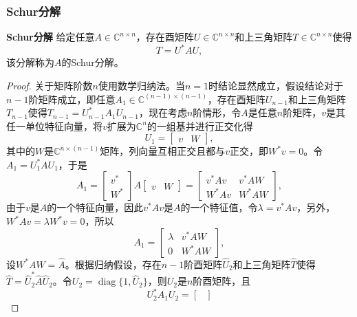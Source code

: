 \documentclass[a4paper,10pt]{ctexart}
\begin{document}
\subsubsection{Schur分解}
\begin{theorem}{\normalfont\bf{Schur分解}}
    给定任意$ A\in \mathbb{C}^{n\times n} $，存在酉矩阵$ U\in \mathbb{C}^{n\times n} $和上三角矩阵$ T\in \mathbb{C}^{n\times n} $使得
    \begin{equation}
        T = U^* A U,
    \end{equation}
    该分解称为$ A $的Schur分解。
\end{theorem}
\begin{proof}
    关于矩阵阶数$ n $使用数学归纳法。当$ n = 1 $时结论显然成立，假设结论对于$ n-1 $阶矩阵成立，即任意$ A_1\in \mathbb{C}^{(n-1)\times (n-1)} $，存在酉矩阵$ U_{n-1} $和上三角矩阵$ T_{n-1} $使得$ T_{n-1} = U_{n-1}^* A_1 U_{n-1} $，现在考虑$ n $阶情形，令$ A $是任意$ n $阶矩阵，$ v $是其任一单位特征向量，将$ v $扩展为$ \mathbb{C}^n $的一组基并进行正交化得
    \[
        U_1 = \begin{bmatrix} 
            v & W 
        \end{bmatrix},
    \]
    其中的$ W $是$ \mathbb{C}^{n\times (n-1)} $矩阵，列向量互相正交且都与$ v $正交，即$ W^*v = 0 $。令$ A_1 = U_1^* A U_1 $，于是
    \[
        A_1 = 
        \begin{bmatrix} 
            v^* \\ W^* 
        \end{bmatrix} A 
        \begin{bmatrix} 
            v & W
        \end{bmatrix} =
        \begin{bmatrix} 
            v^* A v & v^* A W \\
            W^* A v & W^* A W
        \end{bmatrix},
    \]
    由于$ v $是$ A $的一个特征向量，因此$ v^* A v $是$ A $的一个特征值，令$ \lambda = v^* A v $，另外，$ W^* A v = \lambda W^* v = 0 $，所以
    \[
        A_1 = 
        \begin{bmatrix} 
            \lambda & v^* A W \\
            0 & W^* A W
        \end{bmatrix},
    \]
    设$ W^*AW = \hat{A} $。根据归纳假设，存在$ n-1 $阶酉矩阵$ \hat{U}_2 $和上三角矩阵$ \hat{T} $使得$ \hat{T} = \hat{U}_2^* \hat{A} \hat{U}_2 $。令$ U_2 = \operatorname{diag}\{1, \hat{U}_2\} $，则$ U_2 $是$ n $阶酉矩阵，且
    \[
        U_2^* A_1 U_2 = 
        \begin{bmatrix} 

\end{bmatrix}\]
\end{proof}
\end{document}
